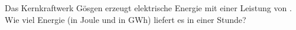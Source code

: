 Das Kernkraftwerk Gösgen erzeugt elektrische Energie mit einer Leistung von \PkkO. Wie viel Energie (in Joule und in GWh) liefert es in einer Stunde?

